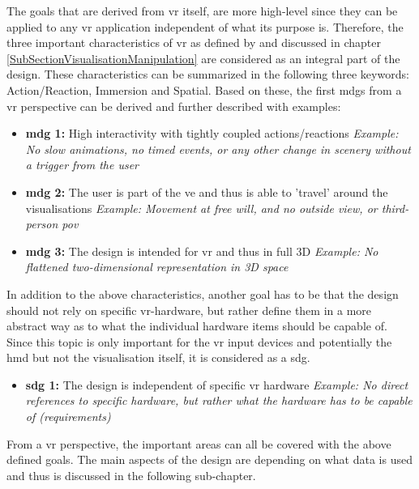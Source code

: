 {The goals that are derived from \gls{vr} itself, are more high-level since they can be applied to any \gls{vr} application independent of what its purpose is. Therefore, the three important characteristics of \gls{vr} as defined by \cite{Stone1994} and discussed in chapter \ref{SubSectionVisualisationManipulation} are considered as an integral part of the design. These characteristics can be summarized in the following three keywords: Action/Reaction, Immersion and Spatial. Based on these, the first \glspl{mdg} from a \gls{vr} perspective can be derived and further described with examples:
\begin{itemize}[noitemsep,nolistsep]
	\item \textbf{\gls{mdg} 1:} High interactivity with tightly coupled actions/reactions \newline
		\textit{Example: No slow animations, no timed events, or any other change in scenery without a trigger from the user}
	\item \textbf{\gls{mdg} 2:} The user is part of the \gls{ve} and thus is able to 'travel' around the visualisations \newline
		\textit{Example: Movement at free will, and no outside view, or third-person \gls{pov}}
	\item \textbf{\gls{mdg} 3:} The design is intended for \gls{vr} and thus in full 3D \newline
		\textit{Example: No flattened two-dimensional representation in 3D space}
\end{itemize}
In addition to the above characteristics, another goal has to be that the design should not rely on specific \gls{vr}-hardware, but rather define them in a more abstract way as to what the individual hardware items should be capable of. Since this topic is only important for the \gls{vr} input devices and potentially the \gls{hmd} but not the visualisation itself, it is considered as a \gls{sdg}.
\begin{itemize}[noitemsep,nolistsep]
	\item \textbf{\gls{sdg} 1:} The design is independent of specific \gls{vr} hardware \newline
	\textit{Example: No direct references to specific hardware, but rather what the hardware has to be capable of (requirements)}
\end{itemize}
From a \gls{vr} perspective, the important areas can all be covered with the above defined goals. The main aspects of the design are depending on what data is used and thus is discussed in the following sub-chapter.


}
